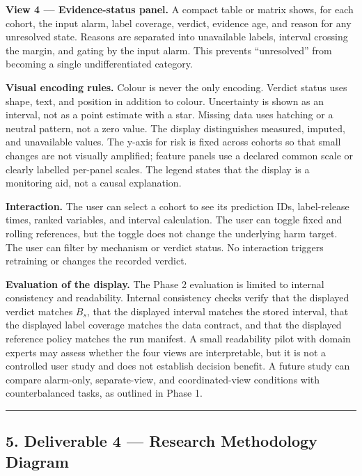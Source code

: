 \documentclass[
]{article}
\begin{document}
\textbf{View 4 --- Evidence-status panel.} A compact table or matrix
shows, for each cohort, the input alarm, label coverage, verdict,
evidence age, and reason for any unresolved state. Reasons are separated
into unavailable labels, interval crossing the margin, and gating by the
input alarm. This prevents ``unresolved'' from becoming a single
undifferentiated category.

\textbf{Visual encoding rules.} Colour is never the only encoding.
Verdict status uses shape, text, and position in addition to colour.
Uncertainty is shown as an interval, not as a point estimate with a
star. Missing data uses hatching or a neutral pattern, not a zero value.
The display distinguishes measured, imputed, and unavailable values. The
y-axis for risk is fixed across cohorts so that small changes are not
visually amplified; feature panels use a declared common scale or
clearly labelled per-panel scales. The legend states that the display is
a monitoring aid, not a causal explanation.

\textbf{Interaction.} The user can select a cohort to see its prediction
IDs, label-release times, ranked variables, and interval calculation.
The user can toggle fixed and rolling references, but the toggle does
not change the underlying harm target. The user can filter by mechanism
or verdict status. No interaction triggers retraining or changes the
recorded verdict.

\textbf{Evaluation of the display.} The Phase 2 evaluation is limited to
internal consistency and readability. Internal consistency checks verify
that the displayed verdict matches \(B_s\), that the displayed interval
matches the stored interval, that the displayed label coverage matches
the data contract, and that the displayed reference policy matches the
run manifest. A small readability pilot with domain experts may assess
whether the four views are interpretable, but it is not a controlled
user study and does not establish decision benefit. A future study can
compare alarm-only, separate-view, and coordinated-view conditions with
counterbalanced tasks, as outlined in Phase 1.

\begin{center}\rule{0.5\linewidth}{0.5pt}\end{center}

\hypertarget{deliverable-4-research-methodology-diagram}{%
\subsection{5. Deliverable 4 --- Research Methodology
Diagram}\label{deliverable-4-research-methodology-diagram}}
\end{document}
